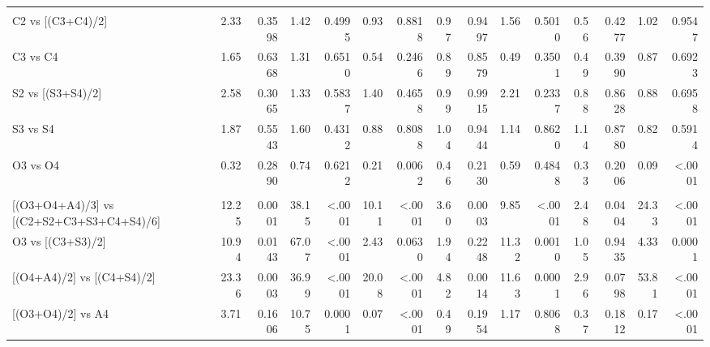 \documentclass[
]{article}
\begin{document}
\begin{landscape}
\begin{table}
{\begin{threeparttable}
\begin{tabular}[t]{lr>{}r|r>{}r|r>{}r|r>{}r|r>{}r|r>{}r|rr}
\addlinespace[0.3em]
\multicolumn{15}{l}{\textbf{(A2) - Rotation system effects within individual crops}}\\
\hspace{1em}\hspace{1em}C2 vs [(C3+C4)/2] & 2.33 & 0.3598 & 1.42 & 0.4995 & 0.93 & 0.8818 & 0.97 & 0.9497 & 1.56 & 0.5010 & 0.56 & 0.4277 & 1.02 & 0.9547\\
\hspace{1em}\hspace{1em}C3 vs C4 & 1.65 & 0.6368 & 1.31 & 0.6510 & 0.54 & 0.2466 & 0.89 & 0.8579 & 0.49 & 0.3501 & 0.49 & 0.3990 & 0.87 & 0.6923\\
\hspace{1em}\hspace{1em}S2 vs [(S3+S4)/2] & 2.58 & 0.3065 & 1.33 & 0.5837 & 1.40 & 0.4658 & 0.99 & 0.9915 & 2.21 & 0.2337 & 0.88 & 0.8628 & 0.88 & 0.6958\\
\hspace{1em}\hspace{1em}S3 vs S4 & 1.87 & 0.5543 & 1.60 & 0.4312 & 0.88 & 0.8088 & 1.04 & 0.9444 & 1.14 & 0.8620 & 1.14 & 0.8780 & 0.82 & 0.5914\\
\hspace{1em}\hspace{1em}O3 vs O4 & 0.32 & 0.2890 & 0.74 & 0.6212 & 0.21 & 0.0062 & 0.46 & 0.2130 & 0.59 & 0.4848 & 0.33 & 0.2006 & 0.09 & <.0001\\
\addlinespace[0.3em]
\multicolumn{15}{l}{\textbf{(A3) - Crop type effects}}\\
\hspace{1em}\hspace{1em}{}[(O3+O4+A4)/3] vs [(C2+S2+C3+S3+C4+S4)/6] & 12.25 & 0.0001 & 38.15 & <.0001 & 10.11 & <.0001 & 3.60 & 0.0003 & 9.85 & <.0001 & 2.48 & 0.0404 & 24.33 & <.0001\\
\hspace{1em}\hspace{1em}O3 vs [(C3+S3)/2] & 10.94 & 0.0143 & 67.07 & <.0001 & 2.43 & 0.0630 & 1.94 & 0.2248 & 11.32 & 0.0010 & 1.05 & 0.9435 & 4.33 & 0.0001\\
\hspace{1em}\hspace{1em}{}[(O4+A4)/2] vs [(C4+S4)/2] & 23.36 & 0.0003 & 36.99 & <.0001 & 20.08 & <.0001 & 4.82 & 0.0014 & 11.63 & 0.0001 & 2.96 & 0.0798 & 53.81 & <.0001\\
\hspace{1em}\hspace{1em}{}[(O3+O4)/2] vs A4 & 3.71 & 0.1606 & 10.75 & 0.0001 & 0.07 & <.0001 & 0.49 & 0.1954 & 1.17 & 0.8068 & 0.37 & 0.1812 & 0.17 & <.0001\\

\end{tabular}
\end{threeparttable}}
\end{table}
\end{landscape}
\end{document}
